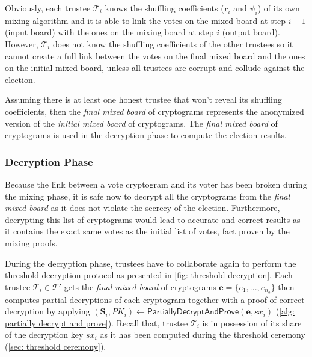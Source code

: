 Obviously, each trustee $\mathcal{T}_i$ knows the shuffling coefficients ($\boldsymbol{r}_i$ and $\psi_i$) of its own mixing algorithm and it is able to link the votes on the mixed board at step $i - 1$ (input board) with the ones on the mixing board at step $i$ (output board). However, $\mathcal{T}_i$ does not know the shuffling coefficients of the other trustees so it cannot create a full link between the votes on the final mixed board and the ones on the initial mixed board, unless all trustees are corrupt and collude against the election.

Assuming there is at least one honest trustee that won't reveal its shuffling coefficients, then the \textit{final mixed board} of cryptograms represents the anonymized version of the \textit{initial mixed board} of cryptograms. The \textit{final mixed board} of cryptograms is used in the decryption phase to compute the election results.


\subsubsection{Decryption Phase} \label{sec: decryption phase}
Because the link between a vote cryptogram and its voter has been broken during the mixing phase, it is safe now to decrypt all the cryptograms from the \textit{final mixed board} as it does not violate the secrecy of the election. Furthermore, decrypting this list of cryptograms would lead to accurate and correct results as it contains the exact same votes as the initial list of votes, fact proven by the mixing proofs.

During the decryption phase, trustees have to collaborate again to perform the threshold decryption protocol as presented in \cref{fig: threshold decryption}. Each trustee \( \mathcal{T}_i \in \boldsymbol{\mathcal{T}'} \) gets the \textit{final mixed board} of cryptograms $\boldsymbol{e} = \{ e_1, ..., e_{n_\mathrm{e}} \}$ then computes partial decryptions of each cryptogram together with a proof of correct decryption by applying $(\boldsymbol{S}_i, PK_i) \gets \mathsf{PartiallyDecryptAndProve}(\boldsymbol{e}, sx_i)$ (\cref{alg: partially decrypt and prove}). Recall that, trustee $\mathcal{T}_i$ is in possession of its share of the decryption key $sx_i$ as it has been computed during the threshold ceremony (\cref{sec: threshold ceremony}).

